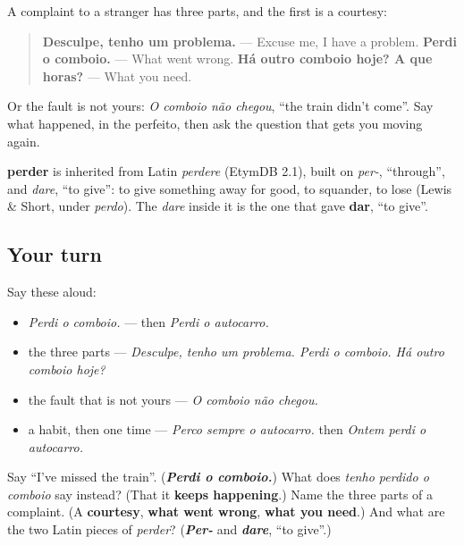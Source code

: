 \begin{grammarlens}[title={Grammar Lens: reporting a problem}]
A complaint to a stranger has three parts, and the first is a courtesy:

\begin{quote}
\textbf{Desculpe, tenho um problema.} — Excuse me, I have a problem. \textbf{Perdi o comboio.} — What went wrong. \textbf{Há outro comboio hoje? A que horas?} — What you need.
\end{quote}

Or the fault is not yours: \emph{O comboio não chegou}, \textquotedblleft{}the train didn't come\textquotedblright{}. Say what happened, in the perfeito, then ask the question that gets you moving again.
\end{grammarlens}

\begin{cousinweb}
\textbf{perder} is inherited from Latin \emph{perdere} (EtymDB 2.1), built on \emph{per-}, \textquotedblleft{}through\textquotedblright{}, and \emph{dare}, \textquotedblleft{}to give\textquotedblright{}: to give something away for good, to squander, to lose (Lewis \& Short, under \emph{perdo}). The \emph{dare} inside it is the one that gave \textbf{dar}, \textquotedblleft{}to give\textquotedblright{}.
\end{cousinweb}

\subsection*{Your turn}
Say these aloud:

\begin{itemize}
\raggedright
  \item \emph{Perdi o comboio.} — then \emph{Perdi o autocarro.}
  \item the three parts — \emph{Desculpe, tenho um problema. Perdi o comboio. Há outro comboio hoje?}
  \item the fault that is not yours — \emph{O comboio não chegou.}
  \item a habit, then one time — \emph{Perco sempre o autocarro.} then \emph{Ontem perdi o autocarro.}
\end{itemize}

\begin{tcolorbox}[breakable,colback=teal!4,colframe=teal!35!black,title={Before you move on}]
Say \textquotedblleft{}I've missed the train\textquotedblright{}. (\emph{\textbf{Perdi o comboio.}}) What does \emph{tenho perdido o comboio} say instead? (That it \textbf{keeps happening}.) Name the three parts of a complaint. (A \textbf{courtesy}, \textbf{what went wrong}, \textbf{what you need}.) And what are the two Latin pieces of \emph{perder}? (\emph{\textbf{Per-}} and \emph{\textbf{dare}}, \textquotedblleft{}to give\textquotedblright{}.)
\end{tcolorbox}
